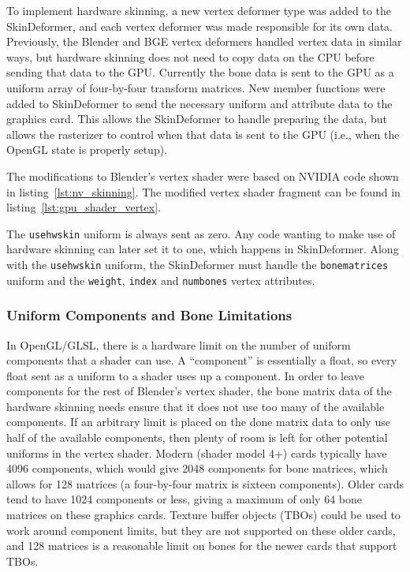 \label{sec:hardware_skinning}

To implement hardware skinning, a new vertex deformer type was added to the SkinDeformer, and each vertex deformer was made responsible for its own data.
Previously, the Blender and BGE vertex deformers handled vertex data in similar ways, but hardware skinning does not need to copy data on the CPU before sending that data to the GPU.
Currently the bone data is sent to the GPU as a uniform array of four-by-four transform matrices.
New member functions were added to SkinDeformer to send the necessary uniform and attribute data to the graphics card.
This allows the SkinDeformer to handle preparing the data, but allows the rasterizer to control when that data is sent to the GPU (i.e., when the OpenGL state is properly setup).

The modifications to Blender's vertex shader were based on NVIDIA code shown in listing~\ref{lst:nv_skinning}.
The modified vertex shader fragment can be found in listing~\ref{lst:gpu_shader_vertex}.


The \texttt{usehwskin} uniform is always sent as zero.
Any code wanting to make use of hardware skinning can later set it to one, which happens in SkinDeformer.
Along with the \texttt{usehwskin} uniform, the SkinDeformer must handle the \texttt{bonematrices} uniform and the \texttt{weight}, \texttt{index} and \texttt{numbones} vertex attributes.


\subsubsection{Uniform Components and Bone Limitations}

In OpenGL/GLSL, there is a hardware limit on the number of uniform components that a shader can use.
A ``component'' is essentially a float, so every float sent as a uniform to a shader uses up a component.
In order to leave components for the rest of Blender's vertex shader, the bone matrix data of the hardware skinning needs ensure that it does not use too many of the available components.
If an arbitrary limit is placed on the done matrix data to only use half of the available components, then plenty of room is left for other potential uniforms in the vertex shader.
Modern (shader model 4+) cards typically have 4096 components, which would give 2048 components for bone matrices, which allows for 128 matrices (a four-by-four matrix is sixteen components).
Older cards tend to have 1024 components or less, giving a maximum of only 64 bone matrices on these graphics cards.
Texture buffer objects (TBOs) could be used to work around component limits\cite{ARB_texture_buffer_object}, but they are not supported on these older cards, and 128 matrices is a reasonable limit on bones for the newer cards that support TBOs.

